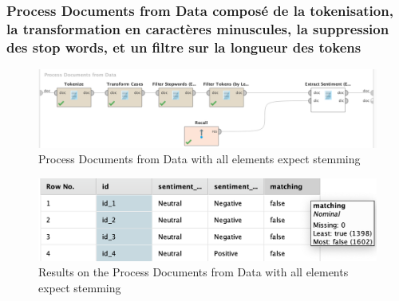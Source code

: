 \documentclass[a4paper]{article}
\begin{document}
\subsubsection{Process Documents from Data composé de la tokenisation, la transformation en caractères minuscules, la suppression des stop words, et un filtre sur la longueur des tokens}
\begin{figure}[H]
	\includegraphics[width=\linewidth]{imgs/part_3/3_processing_documents_no_stem}
	\caption{Process Documents from Data with all elements expect stemming}
	\label{fig:3_processing_documents_no_stem}
\end{figure}
\begin{figure}[H]
	\includegraphics[width=\linewidth]{imgs/part_3/3_processing_documents_no_stem_results}
	\caption{Results on the Process Documents from Data with all elements expect stemming}
	\label{fig:3_processing_documents_no_stem_results}
\end{figure}
	
	
\end{document}

